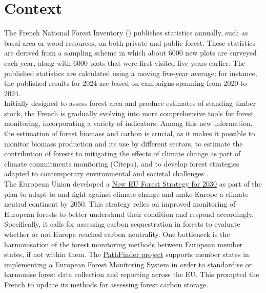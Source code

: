 \chapter{Context\label{chap::context}}

The French National Forest Inventory (\NFI) publishes statistics annually, such as basal area or wood resources, on both private and public forest. These statistics are derived from a sampling scheme in which about \num{6000} new plots are surveyed each year, along with \num{6000} plots that were first visited five years earlier. The published statistics are calculated using a moving five-year average; for instance, the published results for 2024 are based on campaigns spanning from 2020 to 2024. \\

Initially designed to assess forest area and produce estimates of standing timber stock, the French \NFI{} is gradually evolving into more comprehensive tools for forest monitoring, incorporating a variety of indicators. Among this new information, the estimation of forest biomass and carbon is crucial, as it makes it possible to monitor biomass production and its use by different sectors, to estimate the contribution of forests to mitigating the effects of climate change as part of climate commitments monitoring (Citepa), and to develop forest strategies adapted to contemporary environmental and societal challenges \parencite{Commission2018}. \\


The European Union developed a \href{https://eur-lex.europa.eu/legal-content/EN/TXT/?uri=CELEX:52021DC0572}{New EU Forest Strategy for 2030} as part of the plan to adapt to and fight against climate change and make Europe a climate neutral continent by 2050. This strategy relies on improved monitoring of European forests to better understand their condition and respond accordingly. Specifically, it calls for assessing carbon sequestration in forests to evaluate whether or not Eu\-ro\-pe reached carbon neutrality. One bottleneck is the harmonisation of the forest monitoring methods between European member states, if not within them. The \href{https://pathfinder-heu.eu/#top}{PathFinder project} supports member states in implementing a European Forest Monitoring System in order to standardise or harmonise forest data collection and reporting across the EU. This prompted the French \NFI{} to update its methods for assessing forest carbon storage. \\

